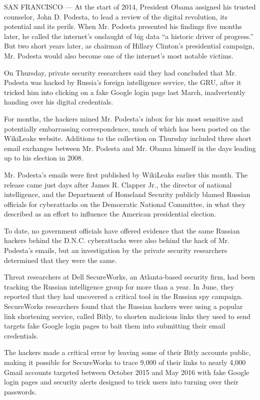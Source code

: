 SAN FRANCISCO --- At the start of 2014, President Obama assigned his
trusted counselor, John D. Podesta, to lead a review of the digital
revolution, its potential and its perils. When Mr. Podesta presented his
findings five months later, he called the internet's onslaught of big
data ``a historic driver of progress.'' But two short years later, as
chairman of Hillary Clinton's presidential campaign, Mr. Podesta would
also become one of the internet's most notable victims.

On Thursday, private security researchers said they had concluded that
Mr. Podesta was hacked by Russia's foreign intelligence service, the
GRU, after it tricked him into clicking on a fake Google login page last
March, inadvertently handing over his digital credentials.

For months, the hackers mined Mr. Podesta's inbox for his most sensitive
and potentially embarrassing correspondence, much of which has been
posted on the WikiLeaks website. Additions to the collection on Thursday
included three short email exchanges between Mr. Podesta and Mr. Obama
himself in the days leading up to his election in 2008.

Mr. Podesta's emails were first published by WikiLeaks earlier this
month. The release came just days after James R. Clapper Jr., the
director of national intelligence, and the Department of Homeland
Security publicly blamed Russian officials for cyberattacks on the
Democratic National Committee, in what they described as an effort to
influence the American presidential election.

To date, no government officials have offered evidence that the same
Russian hackers behind the D.N.C. cyberattacks were also behind the hack
of Mr. Podesta's emails, but an investigation by the private security
researchers determined that they were the same.

Threat researchers at Dell SecureWorks, an Atlanta-based security firm,
had been tracking the Russian intelligence group for more than a year.
In June, they reported that they had uncovered a critical tool in the
Russian spy campaign. SecureWorks researchers found that the Russian
hackers were using a popular link shortening service, called Bitly, to
shorten malicious links they used to send targets fake Google login
pages to bait them into submitting their email credentials.

The hackers made a critical error by leaving some of their Bitly
accounts public, making it possible for SecureWorks to trace 9,000 of
their links to nearly 4,000 Gmail accounts targeted between October 2015
and May 2016 with fake Google login pages and security alerts designed
to trick users into turning over their passwords.

